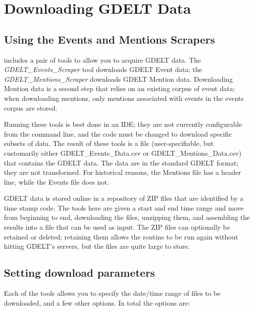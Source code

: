 
\chapter{Downloading GDELT Data} \label{chap:DownloadingGDELTData}

\section{Using the Events and Mentions Scrapers}

\gdgas includes a pair of tools to allow you to acquire GDELT data. The \textit{GDELT\_Events\_Scraper} tool downloads GDELT Event data; the \textit{GDELT\_Mentions\_Scraper} downloads GDELT Mention data. Downloading Mention data is a second step that relies on an existing corpus of event data; when downloading mentions, only mentions associated with events in the events corpus are stored.

Running these tools is best done in an IDE; they are not currently configurable from the command line, and the code must be changed to download specific subsets of data. The result of these tools is a file (user-specifiable, but customarily either GDELT\_Events\_Data.csv or GDELT\_Mentions\_Data.csv) that contains the GDELT data. The data are in the standard GDELT format; they are not transformed. For historical reasons, the Mentions file has a header line, while the Events file does not.

GDELT data is stored online in a repository of ZIP files that are identified by a time stamp code. The tools here are given a start and end time range and move from beginning to end, downloading the files, unzipping them, and assembling the results into a file that can be used as \gdgas input. The ZIP files can optionally be retained or deleted; retaining them allows the routine to be run again without hitting GDELT's servers, but the files are quite large to store.

\section{Setting download parameters}
Each of the tools allows you to specify the date/time range of files to be downloaded, and a few other options. In total the options are:

